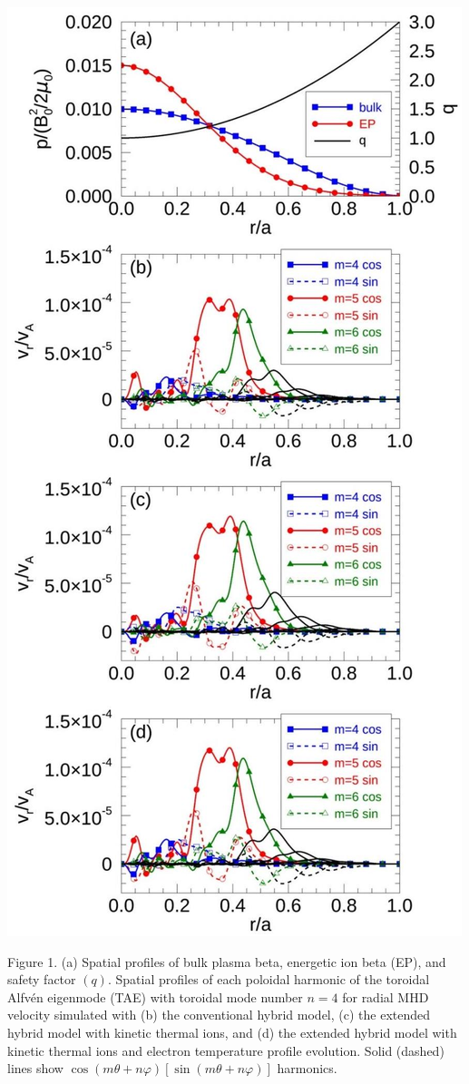 \documentclass[10pt]{article}
\begin{document}
\includegraphics[max width=\textwidth, center]{2023_06_04_de2f4b8aa3fd859f006dg-05}

Figure 1. (a) Spatial profiles of bulk plasma beta, energetic ion beta (EP), and safety factor $(q)$. Spatial profiles of each poloidal harmonic of the toroidal Alfvén eigenmode (TAE) with toroidal mode number $n=4$ for radial MHD velocity simulated with (b) the conventional hybrid model, (c) the extended hybrid model with kinetic thermal ions, and (d) the extended hybrid model with kinetic thermal ions and electron temperature profile evolution. Solid (dashed) lines show $\cos (m \theta+n \varphi)[\sin (m \theta+n \varphi)]$ harmonics.
\end{document}
